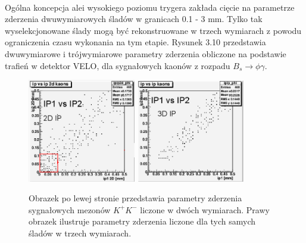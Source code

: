 \documentclass{pracamgr}
\begin{document}
\\
\noindent
Ogólna koncepcja alei wysokiego poziomu trygera zakłada cięcie na parametrze zderzenia dwuwymiarowych śladów w granicach 0.1 - 3 mm. Tylko tak wyselekcjonowane ślady mogą być rekonstruowane w trzech wymiarach z powodu ograniczenia czasu wykonania na tym etapie. Rysunek 3.10 przedstawia dwuwymiarowe i trójwymiarowe parametry zderzenia obliczone na podstawie trafień w detektor VELO, dla sygnałowych kaonów z rozpadu $B_s\rightarrow \phi\gamma$.
\begin{figure}[!h]
 \centering
 \includegraphics[width=0.42\textwidth]{rysunki/ip2d.png}
 \includegraphics[width=0.42\textwidth]{rysunki/ip3d.png}
 \caption{Obrazek po lewej stronie przedstawia parametry zderzenia sygnałowych mezonów $K^+K^-$ liczone w dwóch wymiarach. Prawy obrazek ilustruje parametry zderzenia liczone dla tych samych śladów w trzech wymiarach.}
\end{figure}
\\
\noindent
\end{document}
